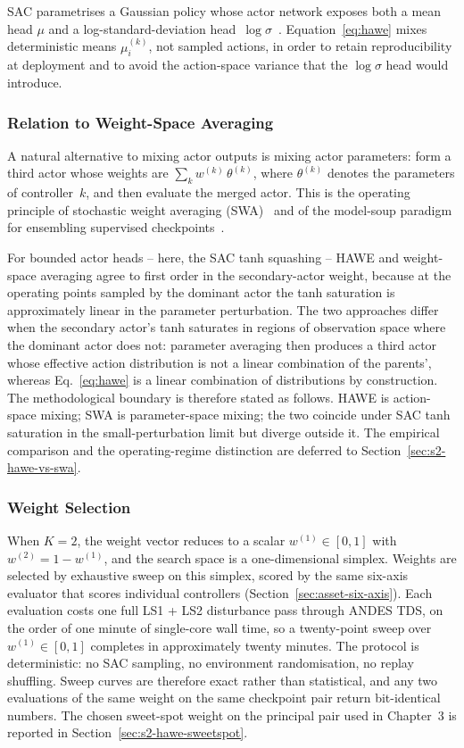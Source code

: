 \documentclass{unnc-fyp}
\begin{document}
SAC parametrises a Gaussian policy whose actor network exposes
both a mean head $\mu$ and a log-standard-deviation
head~$\log\sigma$~\cite{haarnoja2018sac}.
Equation~\eqref{eq:hawe} mixes deterministic means
$\mu_{i}^{(k)}$, not sampled actions, in order to retain
reproducibility at deployment and to avoid the action-space
variance that the $\log\sigma$ head would introduce.

\subsubsection{Relation to Weight-Space Averaging}

A natural alternative to mixing actor outputs is mixing actor
parameters: form a third actor whose weights are
$\sum_{k} w^{(k)}\,\theta^{(k)}$, where $\theta^{(k)}$ denotes the
parameters of controller~$k$, and then evaluate the merged actor.
This is the operating principle of stochastic weight averaging
(SWA)~\cite{izmailov2018swa} and of the model-soup paradigm for
ensembling supervised checkpoints~\cite{wortsman2022modelsoup}.

For bounded actor heads -- here, the SAC tanh squashing -- HAWE
and weight-space averaging agree to first order in the
secondary-actor weight, because at the operating points sampled
by the dominant actor the tanh saturation is approximately linear
in the parameter perturbation.
The two approaches differ when the secondary actor's tanh
saturates in regions of observation space where the dominant
actor does not: parameter averaging then produces a third actor
whose effective action distribution is not a linear combination
of the parents', whereas Eq.~\eqref{eq:hawe} is a linear
combination of distributions by construction.
The methodological boundary is therefore stated as follows.
HAWE is action-space mixing; SWA is parameter-space mixing; the
two coincide under SAC tanh saturation in the small-perturbation
limit but diverge outside it.
The empirical comparison and the operating-regime distinction are
deferred to Section~\ref{sec:s2-hawe-vs-swa}.

\subsubsection{Weight Selection}

When $K = 2$, the weight vector reduces to a scalar
$w^{(1)} \in [0, 1]$ with $w^{(2)} = 1 - w^{(1)}$, and the search
space is a one-dimensional simplex.
Weights are selected by exhaustive sweep on this simplex, scored
by the same six-axis evaluator that scores individual controllers
(Section~\ref{sec:asset-six-axis}).
Each evaluation costs one full LS1 + LS2 disturbance pass through
ANDES TDS, on the order of one minute of single-core wall time, so
a twenty-point sweep over $w^{(1)} \in [0, 1]$ completes in
approximately twenty minutes.
The protocol is deterministic: no SAC sampling, no environment
randomisation, no replay shuffling.
Sweep curves are therefore exact rather than statistical, and any
two evaluations of the same weight on the same checkpoint pair
return bit-identical numbers.
The chosen sweet-spot weight on the principal pair used in
Chapter~3 is reported in Section~\ref{sec:s2-hawe-sweetspot}.
\end{document}
